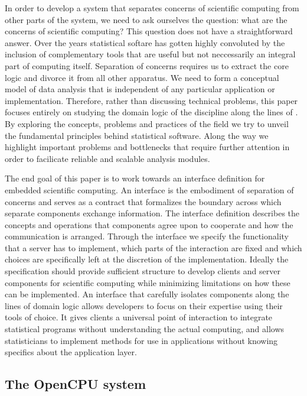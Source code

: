 In order to develop a system that separates concerns of scientific computing from other parts of the system, we need to ask ourselves the question: what are the concerns of scientific computing? This question does not have a straightforward answer. Over the years statistical softare has gotten highly convoluted by the inclusion of complementary tools that are useful but not neccessarily an integral part of computing itself. Separation of concerns requires us to extract the core logic and divorce it from all other apparatus. We need to form a conceptual model of data analysis that is independent of any particular application or implementation. Therefore, rather than discussing technical problems, this paper focuses entirely on studying the domain logic of the discipline along the lines of \cite{evans2004domain}. By exploring the concepts, problems and practices of the field we try to unveil the fundamental principles behind statistical software. Along the way we highlight important problems and bottlenecks that require further attention in order to facilicate reliable and scalable analysis modules.

The end goal of this paper is to work towards an interface definition for embedded scientific computing. An interface is the embodiment of separation of concerns and serves as a contract that formalizes the boundary across which separate components exchange information. The interface definition describes the concepts and operations that components agree upon to cooperate and how the communication is arranged. Through the interface we specify the functionality that a server has to implement, which parts of the interaction are fixed and which choices are specifically left at the discretion of the implementation. Ideally the specification should provide sufficient structure to develop clients and server components for scientific computing while minimizing limitations on how these can be implemented. An interface that carefully isolates components along the lines of domain logic allows developers to focus on their expertise using their tools of choice. It gives clients a universal point of interaction to integrate statistical programs without understanding the actual computing, and allows statisticians to implement methods for use in applications without knowing specifics about the application layer.


\subsection{The OpenCPU system}

